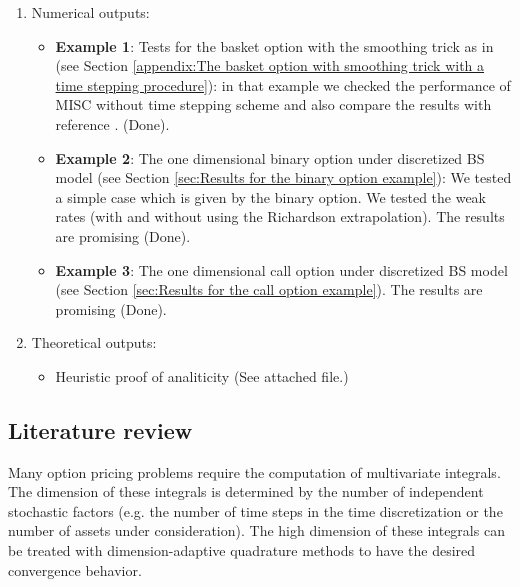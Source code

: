 \documentclass[11pt]{article}
\begin{document}
\begin{enumerate}
	\item Numerical outputs:
	\begin{itemize}
	
	 \item \textbf{Example 1}: Tests for  the basket option with the smoothing trick as in \cite{bayersmoothing} (see Section \ref{appendix:The basket option with smoothing trick with a time stepping procedure}): in that example we  checked the performance of MISC without time stepping scheme and also compare the results with reference \cite{bayersmoothing}. (Done).
	
	
	
		\item 	  \textbf{Example 2}: The one dimensional binary option under discretized BS model (see Section \ref{sec:Results for the binary option example}):  We tested a simple case which is given by the binary option. We tested the weak rates (with and without using the Richardson extrapolation). The results are  promising (Done).
		
		\item \textbf{Example 3}: The one dimensional call option under discretized BS model (see Section \ref{sec:Results for the call option example}). The results are  promising (Done).
		\end{itemize}
	\item  Theoretical outputs:
	\begin{itemize}
		\item Heuristic proof of analiticity (See attached file.)
	\end{itemize}
\end{enumerate}

\subsection{Literature review}




Many option pricing problems  require the computation of multivariate integrals. The dimension of these integrals
is determined by the number of independent stochastic factors (e.g. the number of time steps in the time discretization or the number of assets under consideration).  The high dimension of these integrals can be treated with dimension-adaptive quadrature methods to have the desired convergence behavior.
\end{document}
